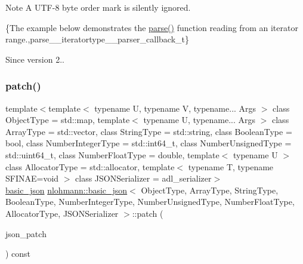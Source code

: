 \begin{DoxyNote}{Note}
A U\+T\+F-\/8 byte order mark is silently ignored.
\end{DoxyNote}
\{The example below demonstrates the {\ttfamily \mbox{\hyperlink{classnlohmann_1_1basic__json_aa9676414f2e36383c4b181fe856aa3c0}{parse()}}} function reading from an iterator range.,parse\+\_\+\+\_\+iteratortype\+\_\+\+\_\+parser\+\_\+callback\+\_\+t\}

\begin{DoxySince}{Since}
version 2.. 
\end{DoxySince}
\mbox{\label{classnlohmann_1_1basic__json_a81e0c41a4a9dff4df2f6973f7f8b2a83}} 
\subsubsection{\texorpdfstring{patch()}{patch()}}
{\footnotesize\ttfamily template$<$template$<$ typename U, typename V, typename... Args $>$ class Object\+Type = std\+::map, template$<$ typename U, typename... Args $>$ class Array\+Type = std\+::vector, class String\+Type  = std\+::string, class Boolean\+Type  = bool, class Number\+Integer\+Type  = std\+::int64\+\_\+t, class Number\+Unsigned\+Type  = std\+::uint64\+\_\+t, class Number\+Float\+Type  = double, template$<$ typename U $>$ class Allocator\+Type = std\+::allocator, template$<$ typename T, typename S\+F\+I\+N\+A\+E=void $>$ class J\+S\+O\+N\+Serializer = adl\+\_\+serializer$>$ \\
\mbox{\hyperlink{classnlohmann_1_1basic__json}{basic\+\_\+json}} \mbox{\hyperlink{classnlohmann_1_1basic__json}{nlohmann\+::basic\+\_\+json}}$<$ Object\+Type, Array\+Type, String\+Type, Boolean\+Type, Number\+Integer\+Type, Number\+Unsigned\+Type, Number\+Float\+Type, Allocator\+Type, J\+S\+O\+N\+Serializer $>$\+::patch (\begin{DoxyParamCaption}\item[{const \mbox{\hyperlink{classnlohmann_1_1basic__json}{basic\+\_\+json}}$<$ Object\+Type, Array\+Type, String\+Type, Boolean\+Type, Number\+Integer\+Type, Number\+Unsigned\+Type, Number\+Float\+Type, Allocator\+Type, J\+S\+O\+N\+Serializer $>$ \&}]{json\+\_\+patch }\end{DoxyParamCaption}) const\hspace{0.3cm}{\ttfamily [inline]}}



